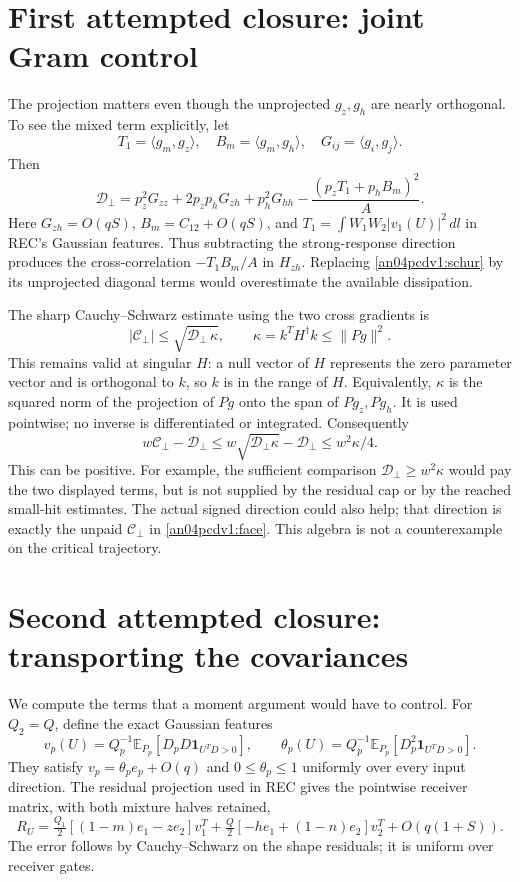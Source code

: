\documentclass[11pt]{article}
\newcommand{\E}{\mathbb E}\newcommand{\dd}{\,d}
\begin{document}
\section{First attempted closure: joint Gram control}
The projection matters even though the unprojected $g_z,g_h$
are nearly orthogonal. To see the mixed term explicitly, let
\[
 T_1=\langle g_m,g_z\rangle,
 \quad B_m=\langle g_m,g_h\rangle,
 \quad G_{ij}=\langle g_i,g_j\rangle.
\]
Then
\begin{equation}\label{an04pcdv1:schur}
 \mathcal D_\perp=
 p_z^2G_{zz}+2p_zp_hG_{zh}+p_h^2G_{hh}
                 -\frac{(p_zT_1+p_hB_m)^2}{A}.
\end{equation}
Here $G_{zh}=O(qS)$, $B_m=C_{12}+O(qS)$, and
$T_1=\int W_1W_2|v_1(U)|^2\dd l$ in REC's Gaussian features.
Thus subtracting the strong-response direction produces the
cross-correlation $-T_1B_m/A$ in $H_{zh}$. Replacing
\eqref{an04pcdv1:schur} by its unprojected diagonal terms would
overestimate the available dissipation.

The sharp Cauchy--Schwarz estimate using the two cross gradients is
\begin{equation}\label{an04pcdv1:cs}
 |\mathcal C_\perp|\le\sqrt{\mathcal D_\perp\,\kappa},
 \qquad \kappa=k^TH^\dagger k\le\|Pg\|^2.
\end{equation}
This remains valid at singular $H$: a null vector of $H$ represents
the zero parameter vector and is orthogonal to $k$, so $k$ is in
the range of $H$. Equivalently, $\kappa$ is the squared norm of
the projection of $Pg$ onto the span of $Pg_z,Pg_h$.
It is used pointwise; no inverse is differentiated or integrated.
Consequently
\[
 w\mathcal C_\perp-\mathcal D_\perp
 \le w\sqrt{\mathcal D_\perp\kappa}-\mathcal D_\perp
 \le w^2\kappa/4.
\]
This can be positive. For example, the sufficient comparison
$\mathcal D_\perp\ge w^2\kappa$ would pay the two displayed
terms, but is not supplied by the residual cap or by the reached
small-hit estimates. The actual signed direction could also help;
that direction is exactly the unpaid $\mathcal C_\perp$ in
\eqref{an04pcdv1:face}. This algebra is not a counterexample
on the critical trajectory.

\section{Second attempted closure: transporting the covariances}
We compute the terms that a moment argument would have to control.
For $Q_2=Q$, define the exact Gaussian features
\[
 v_p(U)=Q_p^{-1}\E_{P_p}[D_pD\mathbf1_{U^TD>0}],\qquad
 \theta_p(U)=Q_p^{-1}\E_{P_p}[D_p^2\mathbf1_{U^TD>0}].
\]
They satisfy $v_p=\theta_pe_p+O(q)$ and $0\le\theta_p\le1$
uniformly over every input direction.
The residual projection used in REC gives the pointwise receiver
matrix, with both mixture halves retained,
\[
 R_U=\tfrac{Q_1}{2}[(1-m)e_1-ze_2]v_1^T
       +\tfrac Q2[-he_1+(1-n)e_2]v_2^T+O(q(1+S)).
\]
The error follows by Cauchy--Schwarz on the shape residuals;
it is uniform over receiver gates.
\end{document}
